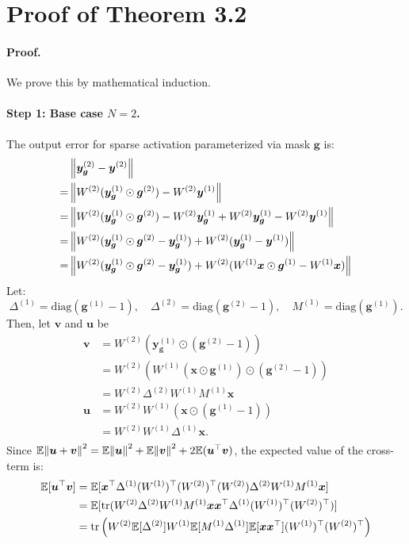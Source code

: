 \section{Proof of Theorem 3.2}

\paragraph{Proof.} We prove this by mathematical induction. 
\paragraph{Step 1: Base case $N=2$.} The output error for sparse activation parameterized via mask $\bm{g}$ is:
\begin{align*}\label{equ}
	&\norm{\bm{y}_{\bm{g}}^{(2)} - \bm{y}^{(2)}} \\
	= &\norm{W^{(2)} (\bm{y}_{\bm{g}}^{(1)} \odot \bm{g}^{(2)}) - W^{(2)} \bm{y}^{(1)}} \\
	= &\norm{W^{(2)} (\bm{y}_{\bm{g}}^{(1)} \odot \bm{g}^{(2)}) - W^{(2)}\bm{y}_{\bm{g}}^{(1)} + W^{(2)}\bm{y}_{\bm{g}}^{(1)}-W^{(2)} \bm{y}^{(1)}} \\
	= &\norm{W^{(2)}{(\bm{y}_{\bm{g}}^{(1)} \odot \bm{g}^{(2)} - \bm{y}_{\bm{g}}^{(1)})} + W^{(2)}{(\bm{y}_{\bm{g}}^{(1)} - \bm{y}^{(1)})}}\\
	= &\norm{W^{(2)}{(\bm{y}_{\bm{g}}^{(1)} \odot \bm{g}^{(2)} - \bm{y}_{\bm{g}}^{(1)}}) + W^{(2)}(W^{(1)} \bm{x}\odot \bm{g}^{(1)} - W^{(1)} \bm{x})}
\end{align*}
Let: 
$$
\Delta^{(1)} = \text{diag}(\bm{g}^{(1)} - 1),\quad \Delta^{(2)} = \text{diag}(\bm{g}^{(2)} - 1), \quad M^{(1)} = \text{diag}(\bm{g}^{(1)}).
$$
Then, let $\bm{v}$ and $\bm{u}$ be 
\begin{align*}
	\bm{v} &=W^{(2)}(\bm{y}_{\bm{g}}^{(1)}\odot(\bm{g}^{(2)}-{1}))\\
	&=W^{(2)}(W^{(1)}(\bm{x}\odot \bm{g}^{(1)})\odot(\bm{g}^{(2)}-1)) \\
	&=W^{(2)}\Delta^{(2)}W^{(1)}M^{(1)}\bm{x}\\
	\bm{u} &=W^{(2)}W^{(1)}(\bm{x}\odot(\bm{g}^{(1)}-1))\\
	&=W^{(2)}W^{(1)}\Delta^{(1)}\bm{x}. \\
\end{align*}
Since $\E{\norm{\bm{u} + \bm{v}}^2} = \E{\norm{\bm{u}}^2} + \E{\norm{\bm{v}}^2} + 2\E{(\bm{u}^\top\bm{v})}$, the expected value of the cross-term is:
\begin{align*}
	\E[\bm{u}^\top\bm{v}] &= \E[\bm{x}^\top\Delta^{(1)}(W^{(1)})^\top(W^{(2)})^\top(W^{(2)})\Delta^{(2)}W^{(1)}M^{(1)}\bm{x}] \\
	&= \E[\text{tr}(W^{(2)}\Delta^{(2)}W^{(1)}M^{(1)}\bm{x}\bm{x}^\top\Delta^{(1)}(W^{(1)})^\top(W^{(2)})^\top)] \\
	&= \text{tr}\left(W^{(2)}\E[\Delta^{(2)}]W^{(1)}\E[M^{(1)}\Delta^{(1)}]\E[\bm{x}\bm{x}^\top](W^{(1)})^\top(W^{(2)})^\top\right)
\end{align*} 
